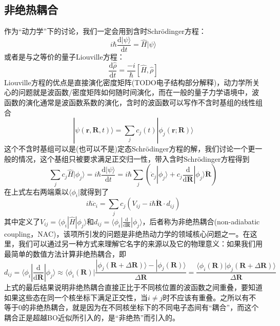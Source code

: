 \documentclass{article}
\numberwithin{equation}{section}
\begin{document}
      \subsection{非绝热耦合}
        作为“动力学”下的讨论，我们一定会用到含时Schr\"odinger方程：
        \begin{equation}
          i \hbar \frac{\mathrm{d} | \psi \rangle}{\mathrm{d} t}=\hat{H} | \psi \rangle
        \end{equation}
        或者是与之等价的量子Liouville方程：
        \begin{equation}
          \frac{\mathrm{d} \hat{\rho}}{\mathrm{d} t}=\frac{-i}{\hbar}[\hat{H}, \hat{\rho}]
        \end{equation}
        Liouville方程的优点是直接演化密度矩阵(TODO电子结构部分解释)，动力学所关心的问题就是波函数/密度矩阵如何随时间演化，而在一般的量子力学语境中，波函数的演化通常是波函数系数的演化，含时的波函数可以写作不含时基组的线性组合
        \begin{equation}
          |\psi(\mathbf{r}, \mathbf{R}, t)\rangle=\sum_{j} c_{j}(t) |\phi_{j}(\mathbf{r} ; \mathbf{R})\rangle
          \label{linear combination}
        \end{equation}
        这个不含时基组可以是(也可以不是)定态Schr\"odinger方程的解，我们讨论一个更一般的情况，这个基组只被要求满足正交归一性，带入含时Schr\"odinger方程得到
        \begin{equation}
          \sum_j c_j \hat{H}|\phi_j\rangle=i \hbar \frac{\mathrm{d} | \psi \rangle}{\mathrm{d} t}=i \hbar\sum_j\left(\dot{c}_j|\phi_j\rangle+c_j\frac{\mathrm{d}}{\mathrm{d}\mathbf{R}}|\phi_j\rangle\dot{\mathbf{R}}\right)
        \end{equation}
        在上式左右两端乘以$\langle\phi_i|$就得到了
        \begin{equation}
          i \hbar \dot{c}_{i}=\sum_{j} c_{j}\left(V_{i j}-i \hbar \dot{\mathbf{R}} \cdot d_{i j}\right)
          \label{time-depend-coeff}
        \end{equation}
        其中定义了$V_{ij}=\langle\phi_i|\hat{H}|\phi_j\rangle$和$d_{ij}=\langle\phi_i|\frac{\mathrm{d}}{\mathrm{d}\mathbf{R}}|\phi_j\rangle$，后者称为非绝热耦合(non-adiabatic coupling，NAC)，该项所引发的问题是非绝热动力学的领域核心问题之一。在这里，我们可以通过另一种方式来理解它名字的来源以及它的物理意义：如果我们用最简单的数值方法计算非绝热耦合，即
        \begin{equation}
          d_{ij}=\langle\phi_i|\frac{\mathrm{d}}{\mathrm{d}\mathbf{R}}|\phi_j\rangle\approx\langle\phi_i(\mathbf{R})|\frac{|\phi_j(\mathbf{R}+\Delta\mathbf{R})\rangle-|\phi_j(\mathbf{R})\rangle}{\Delta\mathbf{R}}
          =\frac{\langle\phi_i(\mathbf{R})|\phi_j(\mathbf{R}+\Delta\mathbf{R})\rangle}{\Delta\mathbf{R}}
          \label{numerical dij}
        \end{equation}
        上式的最后结果说明非绝热耦合直接正比于不同核位置的波函数之间重叠，要知道如果这些态在同一个核坐标下满足正交性，当$i\neq j$时不应该有重叠。之所以有不等于0的非绝热耦合，就是因为在不同核坐标下的不同电子态间有“耦合”，而这个耦合正是超越BO近似所引入的，是“非绝热”而引入的。
\end{document}
